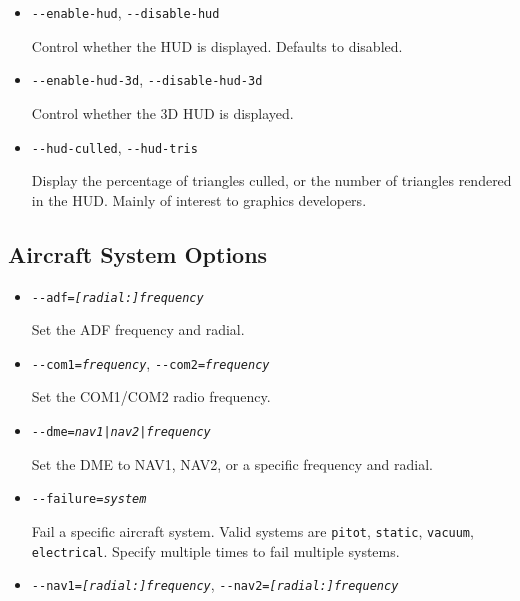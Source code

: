 {\begin{itemize}
Control whether the  (\textbf{H}ead \textbf{U}p  \textbf{D}isplay) is shown anti-aliased.

\item{\texttt{-$ $-enable-hud}, \texttt{-$ $-disable-hud}}

Control whether the HUD is displayed. Defaults to disabled.

\item{\texttt{-$ $-enable-hud-3d}, \texttt{-$ $-disable-hud-3d}}

Control whether the 3D HUD is displayed.

\item{\texttt{-$ $-hud-culled}, \texttt{-$ $-hud-tris}}

Display the percentage of triangles culled, or the number of triangles rendered in the HUD. Mainly
of interest to graphics developers.

\end{itemize}

\subsection{Aircraft System Options}
\begin{itemize}
\item{\texttt{-$ $-adf={\it [radial:]frequency}}}

Set the ADF frequency and radial.

\item{\texttt{-$ $-com1={\it frequency}}, \texttt{-$ $-com2={\it frequency}}}

Set the COM1/COM2 radio frequency.

\item{\texttt{-$ $-dme={\it {nav1|nav2|frequency}}}}

Set the DME to NAV1, NAV2, or a specific frequency and radial.

\item{\texttt{-$ $-failure={\it system}}}

Fail a specific aircraft system. Valid systems are \texttt{pitot}, \texttt{static},
\texttt{vacuum}, \texttt{electrical}. Specify multiple times to fail multiple systems.

\item{\texttt{-$ $-nav1={\it [radial:]frequency}}, \texttt{-$ $-nav2={\it [radial:]frequency}}}


\end{itemize}}
